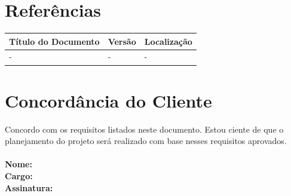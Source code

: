 \documentclass[a4paper, 12pt]{article}
\begin{document}
\section{Referências}
\begin{table}[ht]
	\centering
	
	\begin{tabular}{p{4cm}p{2cm}p{7.5cm}}
		\hline
		\cellcolor{gray}Título do Documento&\cellcolor{gray}Versão&\cellcolor{gray}Localização  \\
		\hline
		-&-&-\\	
		\hline
	\end{tabular}
\end{table}
\section{Concordância do Cliente}
Concordo com os requisitos listados neste documento. Estou ciente de que o planejamento do projeto será realizado com base nesses requisitos aprovados.
\\\\
\textbf{Nome:}
\\
\textbf{Cargo:}
\\
\textbf{Assinatura:}
\end{document}
